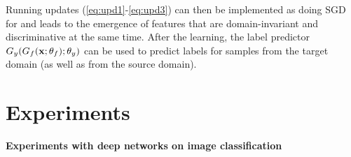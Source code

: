 Running updates (\ref{eq:upd1}-\ref{eq:upd3}) can then be implemented as doing SGD for  and leads to the emergence of features that are domain-invariant and discriminative at the same time. After the learning, the label predictor $G_y(G_f({\mathbf x};{\theta_f});{\theta_y})$ can be used to predict labels for samples from the target domain (as well as from the source domain).


\section{Experiments}
\bigskip\indent\textbf{Experiments with deep networks on image classification}\\


\label{sect:experiments}

